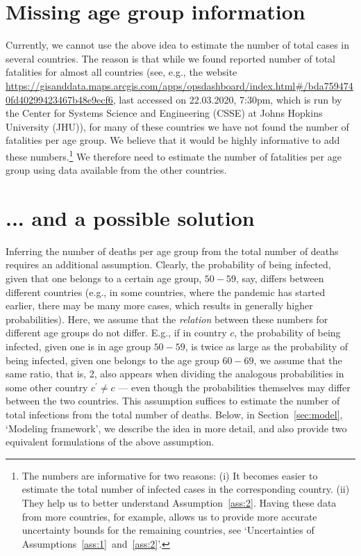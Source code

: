 \documentclass[a4paper]{article}
\begin{document}
\section{Missing age group information} \label{sec:noage}
Currently, we cannot use the above idea to 
estimate the number of total cases in 
several countries. The reason is that 
while we found reported number of total fatalities 
for almost all countries 
(see, e.g., the website {\footnotesize
\url{https://gisanddata.maps.arcgis.com/apps/opsdashboard/index.html#/bda7594740fd40299423467b48e9ecf6}},
last accessed on 22.03.2020, 7:30pm,
which is run by the Center for Systems Science and Engineering ({CSSE}) at Johns Hopkins University ({JHU})), 
for many of these countries we have not found the number of fatalities per age group. 
We believe that it would be highly informative to add these numbers.\footnote{The numbers 
are informative for two reasons: (i) It
becomes easier to estimate the 
total number of infected cases in the 
corresponding country.
(ii) They help us to better understand Assumption~\ref{ass:2}. Having these data from 
more countries, for example, 
allows us to 
provide more accurate uncertainty bounds for 
the remaining countries, see `Uncertainties of Assumptions~\ref{ass:1}~and~\ref{ass:2}'.}
We therefore need to estimate the number of fatalities per age group using data available from the other countries.


\section{... and a possible solution}
Inferring the number of deaths per age group from the total number of deaths requires an additional assumption. 
Clearly, 
the probability of
being infected, given that one 
belongs to a certain age group, $50-59$, say, 
differs between different countries (e.g., in some countries, 
where the pandemic has started earlier, there may be many more cases, which results in generally higher probabilities).
Here, we assume that the \emph{relation} between these numbers for different age groups do not differ.
E.g., if 
in country $c$, the
probability of being infected, given one is in age group $50-59$,
is twice as large as the probability of being infected, given 
one belongs to the age group $60-69$, 
we assume that the same ratio, that is, 2, 
also appears when dividing the analogous probabilities in some other country $c^\prime \neq c$ --- even though the probabilities themselves may differ between the two countries. 
This assumption suffices to estimate the number of total infections
from the total number of deaths.
Below, in Section~\ref{sec:model}, `Modeling framework', we describe the idea in more detail, 
and also provide two equivalent formulations of the above assumption. 
\end{document}
